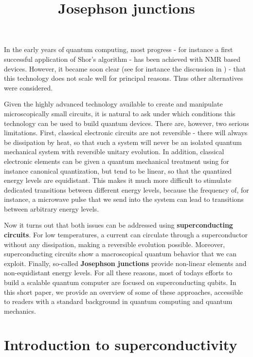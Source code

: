 \documentclass[a4paper, draft]{article}
\title{Josephson junctions}
\theoremstyle{own}
\theoremstyle{remark}
\begin{document}
\maketitle


In the early years of quantum computing, most progress - for instance a first successful application of Shor's algorithm - has been achieved with NMR based devices. However, it became soon clear (see for instance the discussion in \cite{WarrenEtAl}) - that this technology does not scale well for principal reasons. Thus other alternatives were considered.

Given the highly advanced technology available to create and manipulate microscopically small circuits, it is natural to ask under which conditions this technology can be used to build quantum devices. There are, however, two serious limitations. First, classical electronic circuits are not reversible - there will always be dissipation by heat, so that such a system will never be an isolated quantum mechanical system with reversible unitary evolution. In addition, classical electronic elements can be given a quantum mechanical treatment using for instance canonical quantization, but tend to be linear, so that the quantized energy levels are equidistant. This makes it much more difficult to stimulate dedicated transitions between different energy levels, because the frequency of, for instance, a microwave pulse that we send into the system can lead to transitions between arbitrary energy levels.

Now it turns out that both issues can be addressed using {\bf superconducting circuits}. For low temperatures, a current can circulate through a superconductor without any dissipation, making a reversible evolution possible. Moreover, superconducting circuits show a macroscopical quantum behavior that we can exploit. Finally, so-called {\bf Josephson junctions} provide non-linear elements and non-equidistant energy levels. For all these reasons, most of todays efforts to build a scalable quantum computer are focused on superconducting qubits. In this short paper, we provide an overview of some of these approaches, accessible to readers with a standard background in quantum computing and quantum mechanics.

\section{Introduction to superconductivity}
\end{document}
